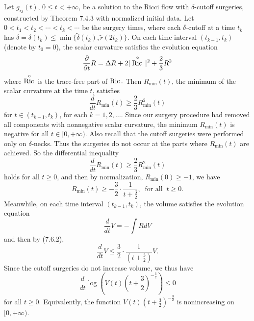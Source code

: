 Let $g_{ij}(t)$, $0 \leq t < +\infty$, be a solution to the Ricci
flow with $\delta$-cutoff surgeries, constructed by Theorem 7.4.3
with normalized initial data. Let $0<t_1<t_2<\cdots<t_k<\cdots$ be
the surgery times, where each $\delta$-cutoff at a time $t_k$ has
$\delta = \delta(t_k) \leq \min
\{\widetilde{\delta}(t_k),\widetilde{r}(2t_k)\}$. On each time
interval $(t_{k-1},t_k)$ (denote by $t_0=0$), the scalar curvature
satisfies the evolution equation \begin{equation} \frac{\partial}{\partial
t}R=\Delta
R+2|\stackrel{\circ}{\Ric}|^2+\frac{2}{3}R^2 %
\end{equation} where $\stackrel{\circ}{{\rm Ric}\,}$ is the trace-free part of
${\rm Ric}\,.$ Then $R_{\min}(t)$, the minimum of the scalar curvature at
the time $t$, satisfies
$$
\frac{d}{dt}R_{\min}(t)\geq \frac{2}{3}R^2_{\min}(t)
$$
for $t\in(t_{k-1},t_k)$, for each $k = 1, 2, \ldots$. Since our
surgery procedure had removed all components with nonnegative
scalar curvature, the minimum $R_{\min}(t)$ is negative for all $t
\in [0,+\infty)$. Also recall that the cutoff surgeries were
performed only on $\delta$-necks. Thus the surgeries do not occur
at the parts where $R_{\min}(t)$ are achieved. So the differential
inequality
$$
\frac{d}{dt}R_{\min}(t)\geq \frac{2}{3}R^2_{\min}(t)
$$
holds for all $t\geq 0$, and then by normalization,
$R_{\min}(0)\geq -1$, we have \begin{equation} R_{\min}(t)\geq
-\frac{3}{2}\cdot\frac{1}{t+\frac{3}{2}}, \
\mbox{ for all } \ t\geq 0. %
\end{equation} Meanwhile, on each time interval $(t_{k-1},t_k)$, the volume
satisfies the evolution equation
$$
\frac{d}{dt}V=-\int RdV
$$
and then by (7.6.2),
$$
\frac{d}{dt}V\leq \frac{3}{2}\cdot\frac{1}{(t+\frac{3}{2})}V.
$$
Since the cutoff surgeries do not increase volume, we thus have
\begin{equation} \frac{d}{dt}\log\left(V(t)\left(t+\frac{3}{2}\right)^{-\frac{3}{2}}\right)\leq 0
\end{equation} for all $t\geq 0$. Equivalently, the function
$V(t)(t+\frac{3}{2})^{-\frac{3}{2}}$ is nonincreasing on
$[0,+\infty)$.

